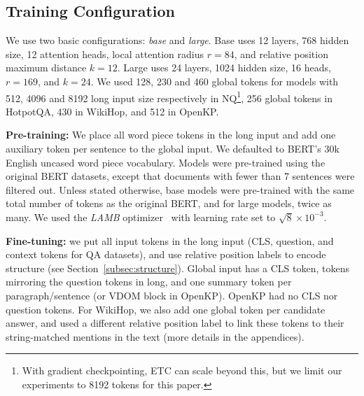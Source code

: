\documentclass[11pt,a4paper]{article}
\begin{document}
\subsection{Training Configuration}

We use two basic configurations: {\em base} and {\em large}. Base uses 12 layers, 768 hidden size, 12 attention heads, local attention radius $r=84$, and relative position maximum distance $k=12$. Large uses 24 layers, 1024 hidden size, 16 heads, $r=169$, and $k=24$. We used 128, 230 and 460 global tokens for models with 512, 4096 and 8192 long input size respectively in NQ\footnote{With gradient checkpointing, ETC can scale beyond this, but we limit our experiments to 8192 tokens for this paper.}, 256 global tokens in HotpotQA, 430 in WikiHop, and 512 in OpenKP.




{\bf Pre-training:} We place all word piece tokens in the long input and add one auxiliary token per sentence to the global input.
We defaulted to BERT's 30k English uncased word piece vocabulary. Models were pre-trained using the original BERT datasets, except that documents with fewer than 7 sentences were filtered out. Unless stated otherwise, base models were pre-trained with the same total number of tokens as the original BERT, and for large models, twice as many. We used the {\em LAMB} optimizer~\cite{you2019large} with learning rate set to $\sqrt{8}\times10^{-3}$. 

{\bf Fine-tuning:} we put all input tokens in the long input (CLS, question, and context tokens for QA datasets), and use relative position labels to encode structure (see Section~\ref{subsec:structure}). Global input has a CLS token, tokens mirroring the question tokens in long, and one summary token per paragraph/sentence (or VDOM block in OpenKP). OpenKP had no CLS nor question tokens. For WikiHop, we also add one global token per candidate answer, and used a different relative position label to link these tokens to their string-matched mentions in the text (more details in the appendices).
\end{document}
